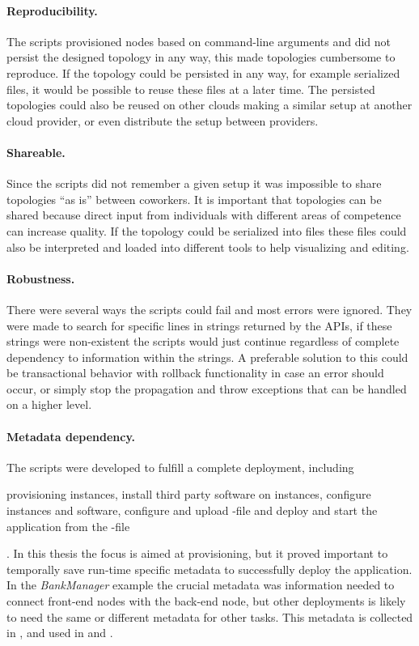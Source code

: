 \paragraph{Reproducibility.}

The scripts provisioned nodes based on command-line arguments
and did not persist the designed topology in any way, 
this made topologies cumbersome to reproduce.
If the topology could be persisted in any way, for example serialized files,
it would be possible to reuse these files at a later time.
The persisted topologies could also be reused on other clouds making a 
similar setup at another cloud provider, or even distribute the setup
between providers.

\paragraph{Shareable.}

Since the scripts did not remember a given setup it was impossible 
to share topologies ``as is'' between coworkers.
It is important that topologies can be shared because direct input from individuals
with different areas of competence can increase quality.
If the topology could be serialized into files these files could also be interpreted
and loaded into different tools to help visualizing and editing.

\paragraph{Robustness.}

There were several ways the scripts could fail and most errors were ignored.
They were made to search for specific lines in strings returned by the APIs,
if these strings were non-existent the scripts would just continue regardless
of complete dependency to information within the strings.
A preferable solution to this could be transactional behavior with rollback functionality
in case an error should occur, or simply stop the propagation
and throw exceptions that can be handled on a higher level.

\paragraph{Metadata dependency.}

The scripts were developed to fulfill a complete deployment,
including 
\begin{ii}
  \iitem provisioning instances, 
  \iitem install third party software on instances,
  \iitem configure instances and software,
  \iitem configure and upload -file and
  \iitem deploy and start the application from the -file
\end{ii}.
In this thesis the focus is aimed at provisioning, but it proved important to temporally 
save run-time specific metadata to successfully deploy the application.
In the \emph{BankManager} example the crucial metadata was information needed to connect 
front-end nodes with the back-end node, but other deployments is likely to need the same 
or different metadata for other tasks.
This metadata is collected in , and used in  and .
